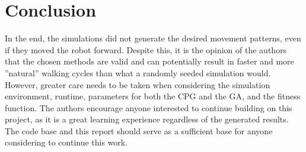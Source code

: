 \section{Conclusion}
In the end, the simulations did not generate the desired movement patterns, even if they moved the robot forward. Despite this, it is the opinion of the authors that the chosen methods are valid and can potentially result in faster and more ''natural'' walking cycles than what a randomly seeded simulation would. However, greater care needs to be taken when considering the simulation environment, runtime, parameters for both the CPG and the GA, and the fitness function. The authors encourage anyone interested to continue building on this project, as it is a great learning experience regardless of the generated results. The code base and this report should serve as a sufficient base for anyone considering to continue this work.